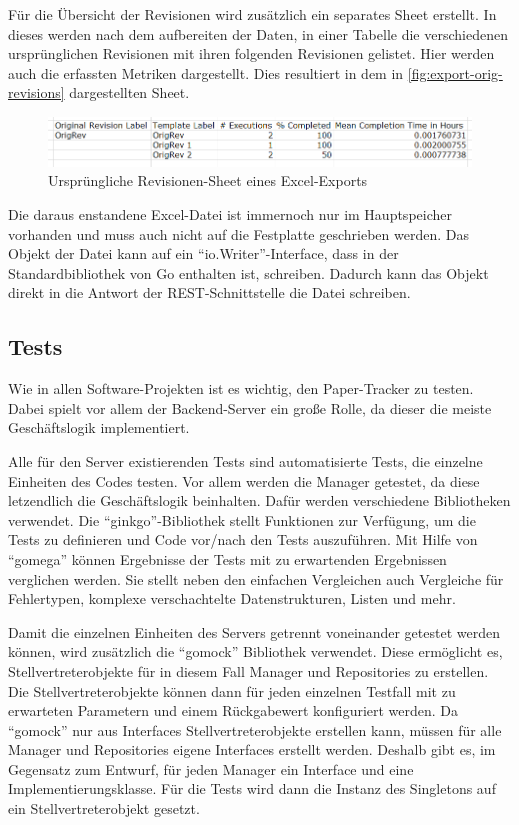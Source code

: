 Für die Übersicht der Revisionen wird zusätzlich ein separates Sheet erstellt.
In dieses werden nach dem aufbereiten der Daten, in einer Tabelle die verschiedenen ursprünglichen Revisionen
mit ihren folgenden Revisionen gelistet.
Hier werden auch die erfassten Metriken dargestellt.
Dies resultiert in dem in \autoref{fig:export-orig-revisions} dargestellten Sheet.

\begin{figure}[htbp]
	\includegraphics[width=\textwidth]{images/export_orig_revisions.png}
	\centering
	\caption{Ursprüngliche Revisionen-Sheet eines Excel-Exports}
	\label{fig:export-orig-revisions}
\end{figure}

Die daraus enstandene Excel-Datei ist immernoch nur im Hauptspeicher vorhanden
und muss auch nicht auf die Festplatte geschrieben werden.
Das Objekt der Datei kann auf ein \enquote{io.Writer}-Interface,
dass in der Standardbibliothek von Go enthalten ist, schreiben.
Dadurch kann das Objekt direkt in die Antwort der \gls{REST}-Schnittstelle die Datei schreiben.

\subsection{Tests}

Wie in allen Software-Projekten ist es wichtig, den Paper-Tracker zu testen.
Dabei spielt vor allem der Backend-Server ein große Rolle, da dieser die meiste Geschäftslogik implementiert.

Alle für den Server existierenden Tests sind automatisierte Tests, die einzelne Einheiten des Codes testen.
Vor allem werden die Manager getestet, da diese letzendlich die Geschäftslogik beinhalten.
Dafür werden verschiedene Bibliotheken verwendet.
Die \enquote{ginkgo}-Bibliothek stellt Funktionen zur Verfügung, um die Tests zu definieren
und Code vor/nach den Tests auszuführen.
Mit Hilfe von \enquote{gomega} können Ergebnisse der Tests mit zu erwartenden Ergebnissen verglichen werden.
Sie stellt neben den einfachen Vergleichen auch Vergleiche für Fehlertypen, komplexe verschachtelte Datenstrukturen,
Listen und mehr.

Damit die einzelnen Einheiten des Servers getrennt voneinander getestet werden können, wird zusätzlich die
\enquote{gomock} Bibliothek verwendet.
Diese ermöglicht es, Stellvertreterobjekte für in diesem Fall Manager und Repositories zu erstellen.
Die Stellvertreterobjekte können dann für jeden einzelnen Testfall mit zu erwarteten Parametern und einem Rückgabewert
konfiguriert werden.
Da \enquote{gomock} nur aus Interfaces Stellvertreterobjekte erstellen kann, müssen für alle Manager
und Repositories eigene Interfaces erstellt werden.
Deshalb gibt es, im Gegensatz zum Entwurf, für jeden Manager ein Interface und eine Implementierungsklasse.
Für die Tests wird dann die Instanz des Singletons auf ein Stellvertreterobjekt gesetzt.

